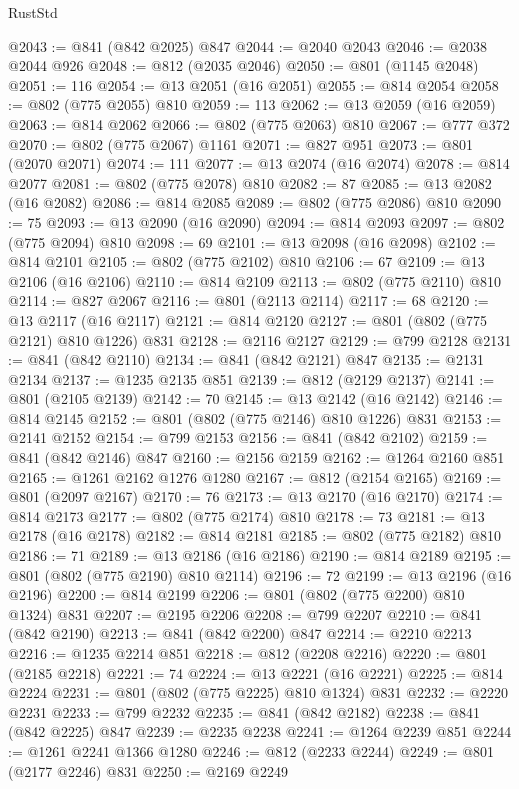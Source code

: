 \begin{lexlean}{RustStd}
\begin{coremodule}
@2043 := @841 (@842 @2025) @847
@2044 := @2040 @2043
@2046 := @2038 @2044 @926
@2048 := @812 (@2035 @2046)
@2050 := @801 (@1145 @2048)
@2051 := 116
@2054 := @13 @2051 (@16 @2051)
@2055 := @814 @2054
@2058 := @802 (@775 @2055) @810
@2059 := 113
@2062 := @13 @2059 (@16 @2059)
@2063 := @814 @2062
@2066 := @802 (@775 @2063) @810
@2067 := @777 @372
@2070 := @802 (@775 @2067) @1161
@2071 := @827 @951
@2073 := @801 (@2070 @2071)
@2074 := 111
@2077 := @13 @2074 (@16 @2074)
@2078 := @814 @2077
@2081 := @802 (@775 @2078) @810
@2082 := 87
@2085 := @13 @2082 (@16 @2082)
@2086 := @814 @2085
@2089 := @802 (@775 @2086) @810
@2090 := 75
@2093 := @13 @2090 (@16 @2090)
@2094 := @814 @2093
@2097 := @802 (@775 @2094) @810
@2098 := 69
@2101 := @13 @2098 (@16 @2098)
@2102 := @814 @2101
@2105 := @802 (@775 @2102) @810
@2106 := 67
@2109 := @13 @2106 (@16 @2106)
@2110 := @814 @2109
@2113 := @802 (@775 @2110) @810
@2114 := @827 @2067
@2116 := @801 (@2113 @2114)
@2117 := 68
@2120 := @13 @2117 (@16 @2117)
@2121 := @814 @2120
@2127 := @801 (@802 (@775 @2121) @810 @1226) @831
@2128 := @2116 @2127
@2129 := @799 @2128
@2131 := @841 (@842 @2110)
@2134 := @841 (@842 @2121) @847
@2135 := @2131 @2134
@2137 := @1235 @2135 @851
@2139 := @812 (@2129 @2137)
@2141 := @801 (@2105 @2139)
@2142 := 70
@2145 := @13 @2142 (@16 @2142)
@2146 := @814 @2145
@2152 := @801 (@802 (@775 @2146) @810 @1226) @831
@2153 := @2141 @2152
@2154 := @799 @2153
@2156 := @841 (@842 @2102)
@2159 := @841 (@842 @2146) @847
@2160 := @2156 @2159
@2162 := @1264 @2160 @851
@2165 := @1261 @2162 @1276 @1280
@2167 := @812 (@2154 @2165)
@2169 := @801 (@2097 @2167)
@2170 := 76
@2173 := @13 @2170 (@16 @2170)
@2174 := @814 @2173
@2177 := @802 (@775 @2174) @810
@2178 := 73
@2181 := @13 @2178 (@16 @2178)
@2182 := @814 @2181
@2185 := @802 (@775 @2182) @810
@2186 := 71
@2189 := @13 @2186 (@16 @2186)
@2190 := @814 @2189
@2195 := @801 (@802 (@775 @2190) @810 @2114)
@2196 := 72
@2199 := @13 @2196 (@16 @2196)
@2200 := @814 @2199
@2206 := @801 (@802 (@775 @2200) @810 @1324) @831
@2207 := @2195 @2206
@2208 := @799 @2207
@2210 := @841 (@842 @2190)
@2213 := @841 (@842 @2200) @847
@2214 := @2210 @2213
@2216 := @1235 @2214 @851
@2218 := @812 (@2208 @2216)
@2220 := @801 (@2185 @2218)
@2221 := 74
@2224 := @13 @2221 (@16 @2221)
@2225 := @814 @2224
@2231 := @801 (@802 (@775 @2225) @810 @1324) @831
@2232 := @2220 @2231
@2233 := @799 @2232
@2235 := @841 (@842 @2182)
@2238 := @841 (@842 @2225) @847
@2239 := @2235 @2238
@2241 := @1264 @2239 @851
@2244 := @1261 @2241 @1366 @1280
@2246 := @812 (@2233 @2244)
@2249 := @801 (@2177 @2246) @831
@2250 := @2169 @2249

\end{coremodule}
\end{lexlean}

